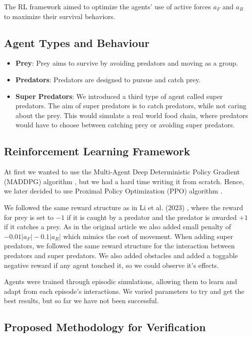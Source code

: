 \documentclass[9pt]{pnas-new}
\begin{document}
	The RL framework aimed to optimize the agents' use of active forces \( a_F \) and \( a_R \) to maximize their survival behaviors.
	
	\subsection{Agent Types and Behaviour}
	\begin{itemize}
		\item \textbf{Prey}: Prey aims to survive by avoiding predators and moving as a group.
		\item \textbf{Predators}: Predators are designed to pursue and catch prey.
		\item \textbf{Super Predators}: We introduced a third type of agent called super predators. The aim of super predators is to catch predators, while not caring about the prey. This would simulate a real world food chain, where predators would have to choose between catching prey or avoiding super predators.
	\end{itemize}
	
	\subsection{Reinforcement Learning Framework} At first we wanted to use the Multi-Agent Deep Deterministic Policy Gradient (MADDPG) algorithm \cite{li2019robust, li2023predator}, but we had a hard time writing it from scratch. Hence, we later decided to use Proximal Policy Optimization (PPO) algorithm \cite{schulman2017proximal}.
	
	We followed the same reward structure as in Li et al. (2023) \cite{li2023predator}, where the reward for prey is set to $-1$ if it is caught by a predator and the predator is awarded $+1$ if it catches a prey. As in the original article we also added small penalty of $-0.01|a_F|-0.1|a_R|$ which mimics the cost of movement.
	When adding super predators, we followed the same reward structure for the interaction between predators and super predators.
	We also added obstacles and added a toggable negative reward if any agent touched it, so we could observe it's effects.
	
	Agents were trained through episodic simulations, allowing them to learn and adapt from each episode's interactions. We varied parameters to try and get the best results, but so far we have not been successful.
	
	\subsection*{Proposed Methodology for Verification}
	
\end{document}
